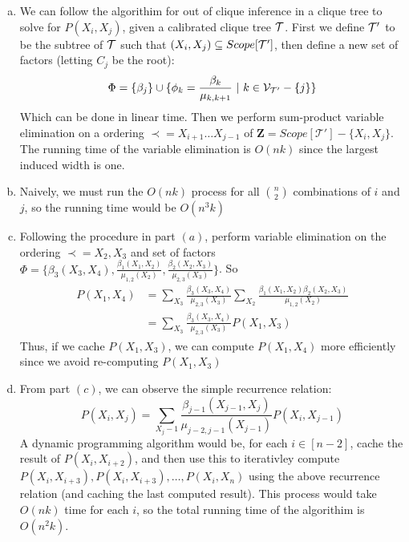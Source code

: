 \documentclass{article}
\begin{document}
\begin{enumerate}[(a)]
    \item We can follow the algorithim for out of clique inference in a clique tree to solve for $P(X_i, X_j)$, given a calibrated clique tree $\cal{T}$. First we define $\cal{T}'$ to be the subtree of $\cal{T}$ such that $(X_i, X_j) \subseteq Scope[\cal{T}']$, then define a new set of factors (letting $C_j$ be the root): \begin{equation*} 
        \Phi = \{\beta_j\} \cup \{ \phi_k = \frac{\beta_k}{\mu_{k, k + 1}} \ | \ k \in \mathcal{V}_{\cal{T'}} - \{j\} \}
    \end{equation*}
    Which can be done in linear time. Then we perform sum-product variable elimination on a ordering $\prec= X_{i + 1} \dots X_{j - 1}$ of $\mathbf{Z} = Scope[\mathcal{T'}] - \{X_i, X_j\}$. The running time of the variable elimination is $O(nk)$ since the largest induced width is one. 
    \item Naively, we must run the $O(nk)$ process for all $\binom{n}{2}$ combinations of $i$ and $j$, so the running time would be $O(n^3k)$
    \item Following the procedure in part $(a)$, perform variable elimination on the ordering $\prec =X_2, X_3 $ and set of factors $\Phi = \{\beta_3(X_3, X_4), \frac{\beta_1(X_1, X_2)}{\mu_{1, 2}(X_2)}, \frac{\beta_2(X_2, X_3)}{\mu_{2, 3}(X_3)}\}$. So \begin{align*}
        P(X_1, X_4) &= \sum_{X_3} \frac{\beta_3(X_3, X_4)}{\mu_{2, 3}(X_3)} \sum_{X_2}\frac{\beta_1(X_1, X_2)\beta_2(X_2, X_3)}{\mu_{1, 2}(X_2)} \\[1.0ex]
        &= \sum_{X_3} \frac{\beta_3(X_3, X_4)}{\mu_{2, 3}(X_3)} P(X_1, X_3)
    \end{align*}
    Thus, if we cache $P(X_1, X_3)$, we can compute $P(X_1, X_4)$ more efficiently since we avoid re-computing $P(X_1, X_3)$
    \item From part $(c)$, we can observe the simple recurrence relation: \begin{equation*}
        P(X_i, X_j) = \sum_{X_j - 1} \frac{\beta_{{j - 1}}(X_{j - 1}, X_j)}{\mu_{{j - 2}, {j - 1}}(X_{j - 1})}P(X_i, X_{j - 1})
    \end{equation*}
    A dynamic programming algorithm would be, for each $i \in [n - 2]$, cache the result of $P(X_i, X_{i + 2})$, and then use this to iterativley compute $P(X_i, X_{i + 3}), P(X_i, X_{i + 3}), \dots ,P(X_i, X_{n})$ using the above recurrence relation (and caching the last computed result). This process would take $O(nk)$ time for each $i$, so the total running time of the algorithim is $O(n^2k)$.
\end{enumerate}
\end{document}
